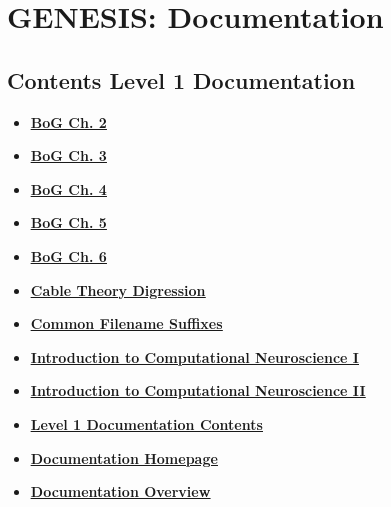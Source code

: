 \documentclass[12pt]{article}
\begin{document}
\section*{GENESIS: Documentation}

\subsection*{Contents Level 1 Documentation}

\begin{itemize}

\item \href{../bog-ch2/bog-ch2.pdf}{\bf \underline{BoG Ch. 2}}

\item \href{../bog-ch3/bog-ch3.pdf}{\bf \underline{BoG Ch. 3}}

\item \href{../bog-ch4/bog-ch4.pdf}{\bf \underline{BoG Ch. 4}}

\item \href{../bog-ch5/bog-ch5.pdf}{\bf \underline{BoG Ch. 5}}

\item \href{../bog-ch6/bog-ch6.pdf}{\bf \underline{BoG Ch. 6}}

\item \href{../cable-theory-digression/cable-theory-digression.pdf}{\bf \underline{Cable Theory Digression}}

\item \href{../common-suffixes/common-suffixes.pdf}{\bf \underline{Common Filename Suffixes}}

\item \href{../compneurosci-1/compneurosci-1.pdf}{\bf \underline{Introduction to Computational Neuroscience I}}

\item \href{../compneurosci-2/compneurosci-2.pdf}{\bf \underline{Introduction to Computational Neuroscience II}}

\item \href{../contents-level1/contents-level1.pdf}{\bf \underline{Level 1 Documentation Contents}}

\item \href{../documentation-homepage/documentation-homepage.pdf}{\bf \underline{Documentation Homepage}}

\item \href{../documentation-overview/documentation-overview.pdf}{\bf \underline{Documentation Overview}}


\end{itemize}
\end{document}
